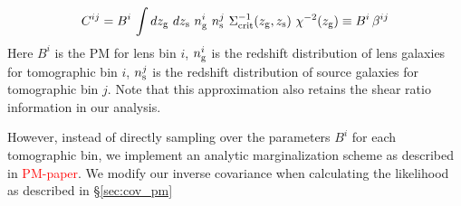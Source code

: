 \documentclass[fleqn,usenatbib]{mnras}
\newcommand{\red}[1]{\textcolor{red}{#1}}
\begin{document}
\begin{equation}\label{eq:pm_Cij}
    C^{ij} = B^i \, \int dz_{\rm g} \ dz_{\rm s} \ n^{i}_{{\rm g}} \ n^{j}_{{\rm s}} \ \Sigma^{-1}_{\rm crit}(z_{\rm g},z_{\rm s}) \ \chi^{-2}(z_{\rm g}) \equiv B^i \, \beta^{ij}
\end{equation}
Here $B^i$ is the PM for lens bin $i$, $n^{i}_{{\rm g}}$ is the redshift distribution of lens galaxies for tomographic bin $i$, $n^{j}_{{\rm s}}$ is the redshift distribution of source galaxies for tomographic bin $j$. Note that this approximation also retains the shear ratio information in our analysis. 

However, instead of directly sampling over the parameters $B^i$ for each tomographic bin, we implement an analytic marginalization scheme as described in \red{PM-paper}. We modify our inverse covariance when calculating the likelihood as described in \S\ref{sec:cov_pm}



    
    
        
    
    
\end{document}
